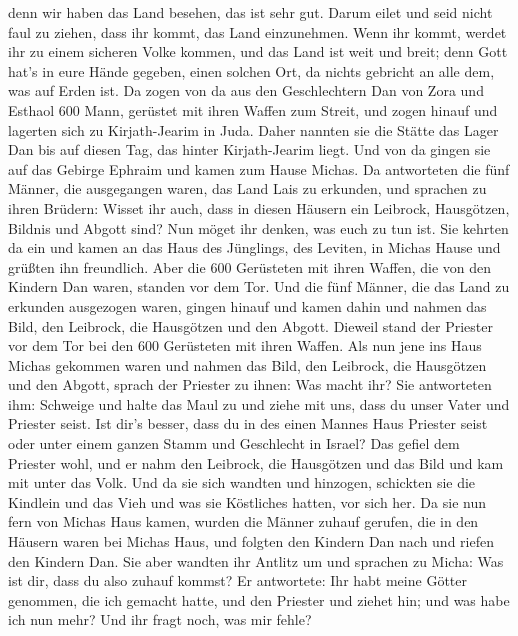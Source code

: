 denn wir haben das Land besehen, das ist sehr gut. Darum eilet und seid
nicht faul zu ziehen, dass ihr kommt, das Land einzunehmen.
 Wenn ihr kommt, werdet ihr zu einem sicheren Volke kommen,
und das Land ist weit und breit; denn Gott hat's in eure Hände gegeben,
einen solchen Ort, da nichts gebricht an alle dem, was auf Erden ist.
 Da zogen von da aus den Geschlechtern Dan von Zora und
Esthaol 600 Mann, gerüstet mit ihren Waffen zum Streit, 
und zogen hinauf und lagerten sich zu Kirjath-Jearim in Juda. Daher
nannten sie die Stätte das Lager Dan bis auf diesen Tag, das hinter
Kirjath-Jearim liegt.  Und von da gingen sie auf das
Gebirge Ephraim und kamen zum Hause Michas.  Da antworteten
die fünf Männer, die ausgegangen waren, das Land Lais zu erkunden, und
sprachen zu ihren Brüdern: Wisset ihr auch, dass in diesen Häusern ein
Leibrock, Hausgötzen, Bildnis und Abgott sind? Nun möget ihr denken, was
euch zu tun ist.  Sie kehrten da ein und kamen an das Haus
des Jünglings, des Leviten, in Michas Hause und grüßten ihn freundlich.
 Aber die 600 Gerüsteten mit ihren Waffen, die von den
Kindern Dan waren, standen vor dem Tor.  Und die fünf
Männer, die das Land zu erkunden ausgezogen waren, gingen hinauf und
kamen dahin und nahmen das Bild, den Leibrock, die Hausgötzen und den
Abgott. Dieweil stand der Priester vor dem Tor bei den 600 Gerüsteten
mit ihren Waffen.  Als nun jene ins Haus Michas gekommen
waren und nahmen das Bild, den Leibrock, die Hausgötzen und den Abgott,
sprach der Priester zu ihnen: Was macht ihr?  Sie
antworteten ihm: Schweige und halte das Maul zu und ziehe mit uns, dass
du unser Vater und Priester seist. Ist dir's besser, dass du in des
einen Mannes Haus Priester seist oder unter einem ganzen Stamm und
Geschlecht in Israel?  Das gefiel dem Priester wohl, und er
nahm den Leibrock, die Hausgötzen und das Bild und kam mit unter das
Volk.  Und da sie sich wandten und hinzogen, schickten sie
die Kindlein und das Vieh und was sie Köstliches hatten, vor sich her.
 Da sie nun fern von Michas Haus kamen, wurden die Männer
zuhauf gerufen, die in den Häusern waren bei Michas Haus, und folgten
den Kindern Dan nach und riefen den Kindern Dan.  Sie aber
wandten ihr Antlitz um und sprachen zu Micha: Was ist dir, dass du also
zuhauf kommst?  Er antwortete: Ihr habt meine Götter
genommen, die ich gemacht hatte, und den Priester und ziehet hin; und
was habe ich nun mehr? Und ihr fragt noch, was mir fehle? 
